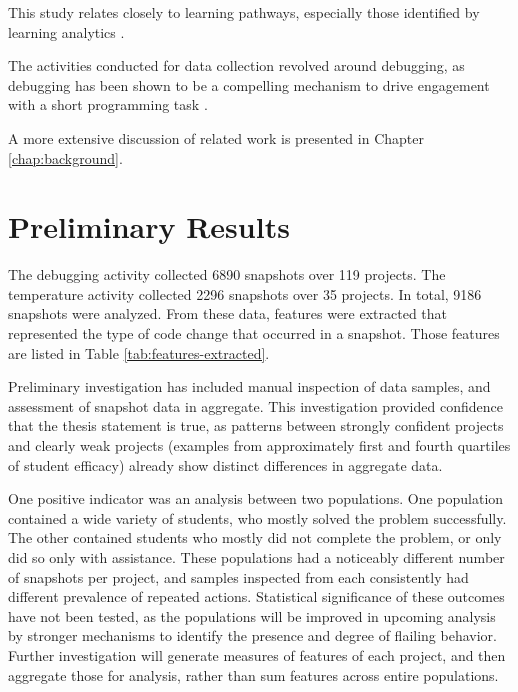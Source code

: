 This study relates closely to learning pathways, especially those identified by learning analytics \citep{martin2013nanogenetic}. 

The activities conducted for data collection revolved around debugging, as debugging has been shown to be a compelling mechanism to drive engagement with a short programming task \citep{webb2010troubleshooting}.

A more extensive discussion of related work is presented in Chapter \ref{chap:background}.

\section{Preliminary Results} %
\label{chap:analysis}
The debugging activity collected 6890 snapshots over 119 projects. The temperature activity collected 2296 snapshots over 35 projects. In total, 9186 snapshots were analyzed. From these data, features were extracted that represented the type of code change that occurred in a snapshot. Those features are listed in Table \ref{tab:features-extracted}. 

Preliminary investigation has included manual inspection of data samples, and assessment of snapshot data in aggregate. This investigation provided confidence that the thesis statement is true, as patterns between strongly confident projects and clearly weak projects (examples from approximately first and fourth quartiles of student efficacy) already show distinct differences in aggregate data. 

One positive indicator was an analysis between two populations. One population contained a wide variety of students, who mostly solved the problem successfully. The other contained students who mostly did not complete the problem, or only did so only with assistance. These populations had a noticeably different number of snapshots per project, and samples inspected from each consistently had different prevalence of repeated actions. Statistical significance of these outcomes have not been tested, as the populations will be improved in upcoming analysis by stronger mechanisms to identify the presence and degree of flailing behavior. Further investigation will generate measures of features of each project, and then aggregate those for analysis, rather than sum features across entire populations.

